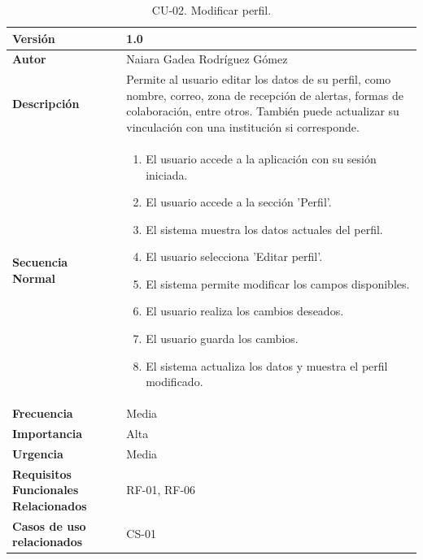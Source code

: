 \begin{table}[htbp]
\begin{tabular}{ |m{3cm}|m{11cm}|  }
\hline
\cellcolor[HTML]{EFEFEF}\textbf{Versión}             & 1.0  \\
\hline
\cellcolor[HTML]{EFEFEF}\textbf{Autor}                & Naiara Gadea Rodríguez Gómez\\
\hline
\cellcolor[HTML]{EFEFEF}\textbf{Descripción}                & { Permite al usuario editar los datos de su perfil, como nombre, correo, zona de recepción de alertas, formas de colaboración, entre otros. También puede actualizar su vinculación con una institución si corresponde. }\\
\hline
\cellcolor[HTML]{EFEFEF}\textbf{Secuencia \newline Normal}                &                 
        \begin{enumerate}
            \item El usuario accede a la aplicación con su sesión iniciada.
            \item El usuario accede a la sección 'Perfil'.
            \item El sistema muestra los datos actuales del perfil.
            \item El usuario selecciona 'Editar perfil'.
            \item El sistema permite modificar los campos disponibles.
            \item El usuario realiza los cambios deseados.
            \item El usuario guarda los cambios.
            \item El sistema actualiza los datos y muestra el perfil modificado.
        \end{enumerate}\\
\hline
\cellcolor[HTML]{EFEFEF}\textbf{Frecuencia}                & Media\\
\hline
\cellcolor[HTML]{EFEFEF}\textbf{Importancia}                & Alta\\
\hline
\cellcolor[HTML]{EFEFEF}\textbf{Urgencia}                & Media\\
\hline
\cellcolor[HTML]{EFEFEF}\textbf{Requisitos Funcionales Relacionados}                & { RF-01, RF-06 }\\
\hline
\cellcolor[HTML]{EFEFEF}\textbf{Casos de uso relacionados}                & { CS-01 }\\
\hline
\end{tabular}
\caption{CU-02. Modificar perfil.}
\end{table}


